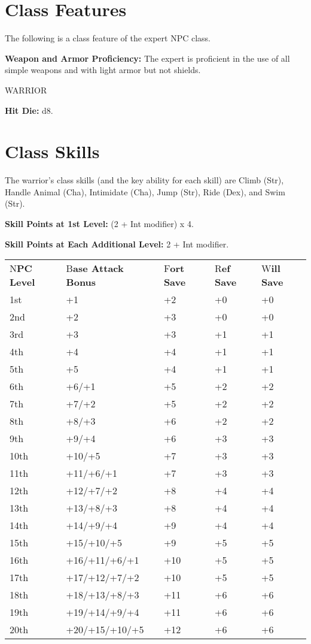 \documentclass{article}
\begin{document}
{\vspace{12pt}
\section*{\textbf{Class Features}}

The following is a class feature of the expert NPC class.

\textbf{Weapon and Armor Proficiency:} The expert is proficient in the use of all 
simple weapons and with light armor but not shields. 

\vspace{12pt}
WARRIOR

\textbf{Hit Die:} d8.

\section*{\textbf{Class Skills}}

The warrior's class skills (and the key ability for each skill) are Climb (Str), 
Handle Animal (Cha), Intimidate (Cha), Jump (Str), Ride (Dex), and Swim (Str).

\textbf{Skill Points at 1st Level: }(2 + Int modifier) x $ $4.

\textbf{Skill Points at Each Additional Level: }2 + Int modifier.

\vspace{12pt}
\begin{tabular}{|>{\raggedright}p{49pt}|>{\raggedright}p{69pt}|>{\raggedright}p{23pt}|>{\raggedright}p{23pt}|>{\raggedright}p{23pt}|}
\hline
\multicolumn{5}{|p{188pt}|}{T\textbf{able: The Warrior}}\tabularnewline
\hline
N\textbf{PC Level} & B\textbf{ase Attack}\linebreak{}
\textbf{Bonus} & F\textbf{ort}\linebreak{}
\textbf{Save} & R\textbf{ef}\linebreak{}
\textbf{Save} & W\textbf{ill}\linebreak{}
\textbf{Save}\tabularnewline
\hline
1st & +1 & +2 & +0 & +0\tabularnewline
\hline
2nd & +2 & +3 & +0 & +0\tabularnewline
\hline
3rd & +3 & +3 & +1 & +1\tabularnewline
\hline
4th & +4 & +4 & +1 & +1\tabularnewline
\hline
5th & +5 & +4 & +1 & +1\tabularnewline
\hline
6th & +6/+1 & +5 & +2 & +2\tabularnewline
\hline
7th & +7/+2 & +5 & +2 & +2\tabularnewline
\hline
8th & +8/+3 & +6 & +2 & +2\tabularnewline
\hline
9th & +9/+4 & +6 & +3 & +3\tabularnewline
\hline
10th & +10/+5 & +7 & +3 & +3\tabularnewline
\hline
11th & +11/+6/+1 & +7 & +3 & +3\tabularnewline
\hline
12th & +12/+7/+2 & +8 & +4 & +4\tabularnewline
\hline
13th & +13/+8/+3 & +8 & +4 & +4\tabularnewline
\hline
14th & +14/+9/+4 & +9 & +4 & +4\tabularnewline
\hline
15th & +15/+10/+5 & +9 & +5 & +5\tabularnewline
\hline
16th & +16/+11/+6/+1 & +10 & +5 & +5\tabularnewline
\hline
17th & +17/+12/+7/+2 & +10 & +5 & +5\tabularnewline
\hline
18th & +18/+13/+8/+3 & +11 & +6 & +6\tabularnewline
\hline
19th & +19/+14/+9/+4 & +11 & +6 & +6\tabularnewline
\hline
20th & +20/+15/+10/+5 & +12 & +6 & +6\tabularnewline
\hline
\end{tabular}

}
\end{document}
